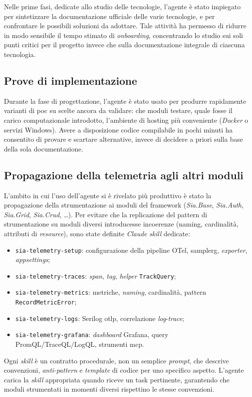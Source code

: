 Nelle prime fasi, dedicate allo studio delle tecnologie, l'agente è stato impiegato
per sintetizzare la documentazione ufficiale delle varie tecnologie, e per confrontare le possibili
soluzioni da adottare. Tale attività ha permesso di ridurre in modo sensibile il tempo stimato di
\emph{onboarding}, concentrando lo studio sui soli punti
critici per il progetto invece che sulla documentazione integrale di ciascuna tecnologia.

\subsection{Prove di implementazione}

Durante la fase di progettazione, l'agente è stato usato per produrre rapidamente varianti di
\gls{poc} su scelte ancora da validare: che moduli testare, quale fosse
il carico computazionale introdotto, l'ambiente di hosting più conveniente (\emph{Docker} o servizi Windows).
Avere a disposizione codice compilabile in pochi minuti ha consentito di provare e
scartare alternative, invece di decidere a priori sulla base della sola documentazione.

\subsection{Propagazione della telemetria agli altri moduli}

L'ambito in cui l'uso dell'agente si è rivelato più produttivo è stato la propagazione
della strumentazione ai moduli del framework (\emph{Sia.Base}, \emph{Sia.Auth},
\emph{Sia.Grid}, \emph{Sia.Crud}, \ldots). Per evitare che la replicazione del pattern di
strumentazione su moduli diversi introducesse incoerenze (naming, cardinalità, attributi
di \emph{resource}), sono state definite \emph{Claude skill} dedicate:

\begin{itemize}
      \item \texttt{sia-telemetry-setup}: configurazione della pipeline OTel, \gls{samplerg},
            \emph{exporter}, \emph{appsettings};
      \item \texttt{sia-telemetry-traces}: \emph{span}, \emph{tag}, \emph{helper} \texttt{TrackQuery};
      \item \texttt{sia-telemetry-metrics}: metriche, \emph{naming}, cardinalità, pattern
            \texttt{RecordMetricError};
      \item \texttt{sia-telemetry-logs}: Serilog \gls{otlp}, correlazione \emph{log}-\emph{trace};
      \item \texttt{sia-telemetry-grafana}: \emph{dashboard} Grafana, query PromQL/TraceQL/LogQL,
            strumenti \gls{mcp}.
\end{itemize}
Ogni \emph{skill} è un contratto procedurale, non un semplice \emph{prompt}, che descrive
convenzioni, \emph{anti-pattern} e \emph{template} di codice per uno specifico aspetto. L'agente
carica la \emph{skill} appropriata quando riceve un task pertinente, garantendo che
moduli strumentati in momenti diversi rispettino le stesse convenzioni.

